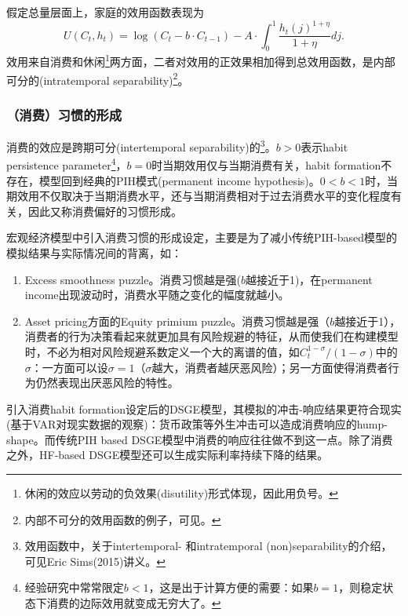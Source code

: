假定总量层面上，家庭的效用函数表现为
\begin{equation}
  \label{eq:hh-utility-C-t-h-int}
  U(C_t,h_{t}) = \log(C_t - b \cdot C_{t-1}) - A \cdot \int_{0}^{1} \frac{h_{t}(j)^{1+\eta}}{1+\eta} dj.
\end{equation}
效用来自消费和休闲\footnote{休闲的效应以劳动的负效果(disutility)形式体现，因此用负号。}两方面，二者对效用的正效果相加得到总效用函数，是内部可分的(intratemporal separability)\footnote{内部不可分的效用函数的例子，可见\cite{King:1988bk,King:1988kf,Greenwood:1988jn,GuerronQuintana:2008jo}。}。

\subsubsection{（消费）习惯的形成}
\label{sec:hh-consumption-habit-formation}
消费的效应是跨期可分(intertemporal separability)的\footnote{效用函数中，关于intertemporal- 和intratemporal (non)separability的介绍，可见Eric Sims(2015)讲义。}。$b>0$表示habit persistence parameter\footnote{经验研究中常常限定$b<1$，这是出于计算方便的需要：如果$b=1$，则稳定状态下消费的边际效用就变成无穷大了。}，$b=0$时当期效用仅与当期消费有关，habit formation不存在，模型回到经典的PIH模式(permanent income hypothesis)。$0<b<1$时，当期效用不仅取决于当期消费水平，还与当期消费相对于过去消费水平的变化程度有关，因此又称消费偏好的习惯形成。

宏观经济模型中引入消费习惯的形成设定，主要是为了减小传统PIH-based模型的模拟结果与实际情况间的背离，如：
\begin{enumerate}
\item Excess smoothness puzzle。消费习惯越是强($b$越接近于1)，在permanent income出现波动时，消费水平随之变化的幅度就越小\citep{Carroll:1997ba,Carroll:2000em}。
\item Asset pricing方面的Equity primium puzzle。消费习惯越是强（$b$越接近于1），消费者的行为决策看起来就更加具有风险规避的特征，从而使我们在构建模型时，不必为相对风险规避系数定义一个大的离谱的值，如$C_t^{1-\sigma}/(1-\sigma)$中的$\sigma$：一方面可以设$\sigma = 1$（$\sigma$越大，消费者越厌恶风险）；另一方面使得消费者行为仍然表现出厌恶风险的特性\citep{Constantinides:1990cu,Boldrin:2001hb}。
\end{enumerate}

引入消费habit formation设定后的DSGE模型，其模拟的冲击-响应结果更符合现实(基于VAR对现实数据的观察)：货币政策等外生冲击可以造成消费响应的hump-shape。而传统PIH based DSGE模型中消费的响应往往做不到这一点\citep{Fuhrer:2000ez}。除了消费之外，HF-based DSGE模型还可以生成实际利率持续下降的结果。

